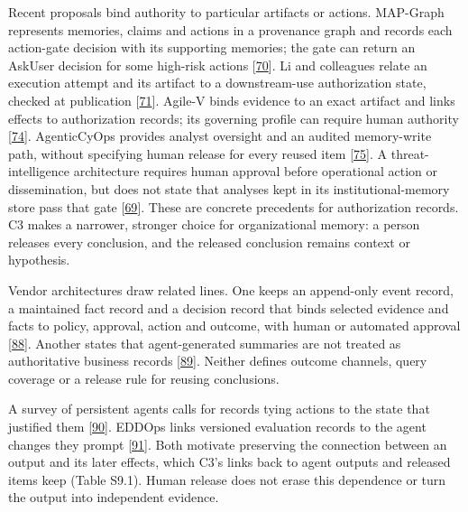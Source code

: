\documentclass[
  11pt,
]{article}
\begin{document}
Recent proposals bind authority to particular artifacts or actions.
MAP-Graph represents memories, claims and actions in a provenance graph
and records each action-gate decision with its supporting memories; the
gate can return an AskUser decision for some high-risk actions
{[}\protect\hyperlink{ref-Wang2026MAPGraph}{70}{]}. Li and colleagues
relate an execution attempt and its artifact to a downstream-use
authorization state, checked at publication
{[}\protect\hyperlink{ref-Li2026EvidenceToEffect}{71}{]}. Agile-V binds
evidence to an exact artifact and links effects to authorization
records; its governing profile can require human authority
{[}\protect\hyperlink{ref-Koch2026AgileV}{74}{]}. AgenticCyOps provides
analyst oversight and an audited memory-write path, without specifying
human release for every reused item
{[}\protect\hyperlink{ref-Mitra2026AgenticCyOps}{75}{]}. A
threat-intelligence architecture requires human approval before
operational action or dissemination, but does not state that analyses
kept in its institutional-memory store pass that gate
{[}\protect\hyperlink{ref-AlbarrakJagtap2026Industry4CTI}{69}{]}. These
are concrete precedents for authorization records. C3 makes a narrower,
stronger choice for organizational memory: a person releases every
conclusion, and the released conclusion remains context or hypothesis.

Vendor architectures draw related lines. One keeps an append-only event
record, a maintained fact record and a decision record that binds
selected evidence and facts to policy, approval, action and outcome,
with human or automated approval
{[}\protect\hyperlink{ref-Alten2026DecisionRecords}{88}{]}. Another
states that agent-generated summaries are not treated as authoritative
business records
{[}\protect\hyperlink{ref-Talamadupula2026AgentMemory}{89}{]}. Neither
defines outcome channels, query coverage or a release rule for reusing
conclusions.

A survey of persistent agents calls for records tying actions to the
state that justified them
{[}\protect\hyperlink{ref-Ding2026AlwaysOn}{90}{]}. EDDOps links
versioned evaluation records to the agent changes they prompt
{[}\protect\hyperlink{ref-Xia2024EDDOps}{91}{]}. Both motivate
preserving the connection between an output and its later effects, which
C3's links back to agent outputs and released items keep (Table S9.1).
Human release does not erase this dependence or turn the output into
independent evidence.
\end{document}
